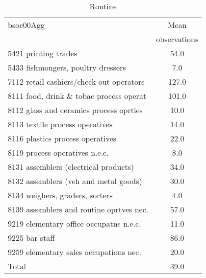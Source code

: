 \begin{table}
	\centering
	\caption{Routine}
	\begin{tabular}{lc}
	\toprule	
		
bsoc00Agg&Mean \\
&observations \\
\hline
5421 printing trades&54.0 \\
5433 fishmongers, poultry dressers&7.0 \\
7112 retail cashiers/check-out operators&127.0 \\
8111 food, drink \& tobac process operat&101.0 \\
8112 glass and ceramics process oprties&10.0 \\
8113 textile process operatives&14.0 \\
8116 plastics process operatives&22.0 \\
8119 process operatives n.e.c.&8.0 \\
8131 assemblers (electrical products)&34.0 \\
8132 assemblers (veh and metal goods)&30.0 \\
8134 weighers, graders, sorters&4.0 \\
8139 assemblers and routine oprtves nec.&57.0 \\
9219 elementary office occupatns n.e.c.&11.0 \\
9225 bar staff&86.0 \\
9259 elementary sales occupations nec.&20.0 \\
Total&39.0 \\
\bottomrule
\bottomrule
\end{tabular}
\end{table}
